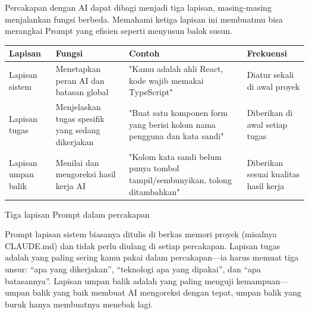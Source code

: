 


Percakapan dengan AI dapat dibagi menjadi tiga lapisan, masing-masing menjalankan fungsi berbeda. Memahami ketiga lapisan ini membuatmu bisa merangkai Prompt yang efisien seperti menyusun balok susun.

\begin{center}
\begin{tabularx}{\linewidth}{|X|X|X|X|}
\hline
\textbf{Lapisan} & \textbf{Fungsi} & \textbf{Contoh} & \textbf{Frekuensi} \tabularnewline
\hline
Lapisan sistem & Menetapkan peran AI dan batasan global & "Kamu adalah ahli React, kode wajib memakai TypeScript" & Diatur sekali di awal proyek \tabularnewline
Lapisan tugas & Menjelaskan tugas spesifik yang sedang dikerjakan & "Buat satu komponen form yang berisi kolom nama pengguna dan kata sandi" & Diberikan di awal setiap tugas \tabularnewline
Lapisan umpan balik & Menilai dan mengoreksi hasil kerja AI & "Kolom kata sandi belum punya tombol tampil/sembunyikan, tolong ditambahkan" & Diberikan sesuai kualitas hasil kerja \tabularnewline
\hline
\end{tabularx}
\end{center}

\begin{center}\small\color{gray}Tiga lapisan Prompt dalam percakapan\end{center}

Prompt lapisan sistem biasanya ditulis di berkas memori proyek (misalnya CLAUDE.md) dan tidak perlu diulang di setiap percakapan. Lapisan tugas adalah yang paling sering kamu pakai dalam percakapan—ia harus memuat tiga unsur: “apa yang dikerjakan”, “teknologi apa yang dipakai”, dan “apa batasannya”. Lapisan umpan balik adalah yang paling menguji kemampuan—umpan balik yang baik membuat AI mengoreksi dengan tepat, umpan balik yang buruk hanya membuatnya menebak lagi.

